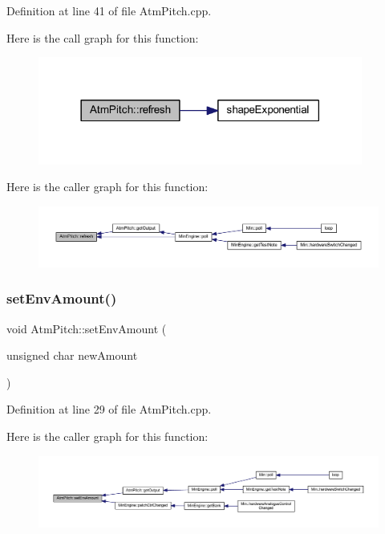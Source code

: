 Definition at line 41 of file Atm\+Pitch.\+cpp.

Here is the call graph for this function\+:
\nopagebreak
\begin{figure}[H]
\begin{center}
\leavevmode
\includegraphics[width=302pt]{class_atm_pitch_a2fc4d9ea4f73818022f9512a656b9572_cgraph}
\end{center}
\end{figure}
Here is the caller graph for this function\+:
\nopagebreak
\begin{figure}[H]
\begin{center}
\leavevmode
\includegraphics[width=350pt]{class_atm_pitch_a2fc4d9ea4f73818022f9512a656b9572_icgraph}
\end{center}
\end{figure}
\mbox{\label{class_atm_pitch_a6e1cbd180ffd94db37eceb4fe95b039b}} 
\subsubsection{\texorpdfstring{set\+Env\+Amount()}{setEnvAmount()}}
{\footnotesize\ttfamily void Atm\+Pitch\+::set\+Env\+Amount (\begin{DoxyParamCaption}\item[{unsigned char}]{new\+Amount }\end{DoxyParamCaption})}



Definition at line 29 of file Atm\+Pitch.\+cpp.

Here is the caller graph for this function\+:
\nopagebreak
\begin{figure}[H]
\begin{center}
\leavevmode
\includegraphics[width=350pt]{class_atm_pitch_a6e1cbd180ffd94db37eceb4fe95b039b_icgraph}
\end{center}
\end{figure}
\mbox{\label{class_atm_pitch_a5e7f1f2581cc25bb966fdfe0c945923d}} 

